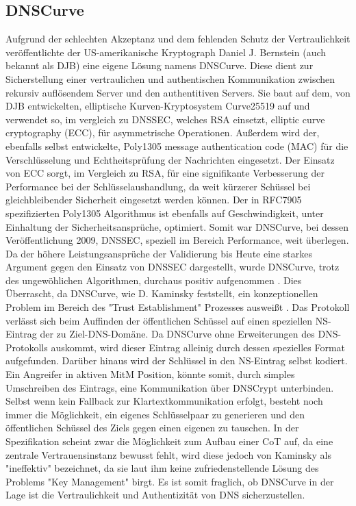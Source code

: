\subsection{DNSCurve}

Aufgrund der schlechten Akzeptanz und dem fehlenden Schutz der Vertraulichkeit veröffentlichte der US-amerikanische Kryptograph Daniel J. Bernstein (auch bekannt als DJB) eine eigene Lösung namens DNSCurve. Diese dient zur Sicherstellung einer vertraulichen und authentischen Kommunikation zwischen rekursiv auflösendem Server und den authentitiven Servers. Sie baut auf dem, von DJB entwickelten, elliptische Kurven-Kryptosystem Curve25519 auf und verwendet so, im vergleich zu DNSSEC, welches RSA einsetzt, elliptic curve cryptography (ECC), für asymmetrische Operationen. Außerdem wird der, ebenfalls selbst entwickelte, Poly1305 message authentication code (MAC) für die Verschlüsselung und Echtheitsprüfung der Nachrichten eingesetzt. Der Einsatz von ECC sorgt, im Vergleich zu RSA, für eine signifikante Verbesserung der Performance bei der Schlüsselaushandlung, da weit kürzerer Schüssel bei gleichbleibender Sicherheit eingesetzt werden können\cite{Gupta2002}. Der in RFC7905 spezifizierten Poly1305 Algorithmus ist ebenfalls auf Geschwindigkeit, unter Einhaltung der Sicherheitsansprüche, optimiert\cite{Bernstein2005}. Somit war DNSCurve, bei dessen Veröffentlichung 2009, DNSSEC, speziell im Bereich Performance, weit überlegen. Da der höhere Leistungsansprüche der Validierung bis Heute eine starkes Argument gegen den Einsatz von DNSSEC dargestellt, wurde DNSCurve, trotz des ungewöhlichen Algorithmen, durchaus positiv aufgenommen \cite{Henry2013}. Dies Überrascht, da DNSCurve, wie D. Kaminsky feststellt, ein konzeptionellen Problem im Bereich des "Trust Establishment" Prozesses ausweißt \cite{Kaminsky2011}. Das Protokoll verlässt sich beim Auffinden der öffentlichen Schüssel auf einen speziellen NS-Eintrag der zu Ziel-DNS-Domäne. Da DNSCurve ohne Erweiterungen des DNS-Protokolls auskommt, wird dieser Eintrag alleinig durch dessen spezielles Format aufgefunden. Darüber hinaus wird der Schlüssel in den NS-Eintrag selbst kodiert. Ein Angreifer in aktiven MitM Position, könnte somit, durch simples Umschreiben des Eintrags, eine Kommunikation über DNSCrypt unterbinden. Selbst wenn kein Fallback zur Klartextkommunikation erfolgt, besteht noch immer die Möglichkeit, ein eigenes Schlüsselpaar zu generieren und den öffentlichen Schüssel des Ziels gegen einen eigenen zu tauschen. In der Spezifikation scheint zwar die Möglichkeit zum Aufbau einer CoT auf, da eine zentrale Vertrauensinstanz bewusst fehlt, wird diese jedoch von Kaminsky als "ineffektiv" bezeichnet, da sie laut ihm keine zufriedenstellende Lösung des Problems "Key Management" birgt. Es ist somit fraglich, ob DNSCurve in der Lage ist die Vertraulichkeit und Authentizität von DNS sicherzustellen.

